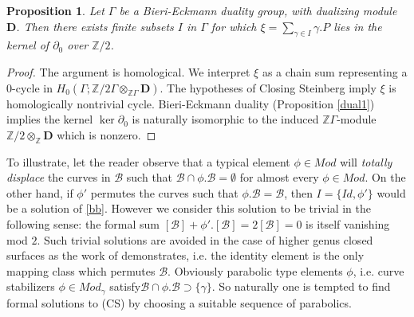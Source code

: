 \documentclass[12pt]{amsart}
\newtheorem{prop}[thm]{Proposition}
\theoremstyle{definition}
\theoremstyle{remark}
\newcommand{\bZ}{\mathbb{Z}}
\newcommand{\del}{\partial}
\newcommand{\sB}{\mathscr{B}}
\begin{document}
\begin{prop}\label{noobs}
Let $\Gamma$ be a Bieri-Eckmann duality group, with dualizing module $\mathbf{D}$. Then there exists finite subsets $I$ in $\Gamma$ for which $\xi=\sum_{\gamma\in I}\gamma.P$ lies in the kernel of $\del_0$ over $\bZ/2$.
\end{prop}
\begin{proof}
The argument is homological. We interpret $\xi$ as a chain sum representing a $0$-cycle in $H_0(\Gamma; \bZ/2 \Gamma \otimes_{\bZ \Gamma} \textbf{D})$. The hypotheses of Closing Steinberg imply $\xi$ is homologically nontrivial cycle. Bieri-Eckmann duality (Proposition \ref{dual1}) implies the kernel $\ker \del_0$ is naturally isomorphic to the induced $\bZ \Gamma$-module $\bZ /2 \otimes_\bZ \textbf{D}$ which is nonzero. 
\end{proof}

To illustrate, let the reader observe that a typical element $\phi\in Mod$ will \emph{totally displace} the curves in $\sB$ such that $\sB \cap \phi.\sB=\emptyset$ for almost every $\phi\in Mod$. On the other hand, if $\phi'$ permutes the curves such that $\phi.\sB=\sB$, then $I=\{Id,\phi'\}$ would be a solution of \eqref{bb}. However we consider this solution to be trivial in the following sense: the formal sum $[\sB]+\phi'.[\sB]=2[\sB]=0$ is itself vanishing mod $2$. Such trivial solutions are avoided in the case of higher genus closed surfaces as the work of \cite{birman2013finite} demonstrates, i.e. the identity element is the only mapping class which permutes $\sB$. Obviously parabolic type elements $\phi$, i.e. curve stabilizers $\phi\in Mod_\gamma$ satisfy$\sB \cap \phi.\sB \supset \{\gamma\}$. So naturally one is tempted to find formal solutions to (CS) by choosing a suitable sequence of parabolics. 
\end{document}
